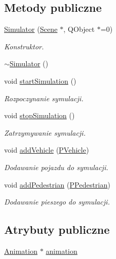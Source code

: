 \subsection*{Metody publiczne}
\begin{DoxyCompactItemize}
\item 
\hyperlink{class_simulator_a777790f7422ca543634ed4ac80862f6a}{Simulator} (\hyperlink{class_scene}{Scene} $\ast$, Q\-Object $\ast$=0)
\begin{DoxyCompactList}\small\item\em Konstruktor. \end{DoxyCompactList}\item 
\hyperlink{class_simulator_a0f49aa04f42060a785adf77346b9de9f}{$\sim$\-Simulator} ()
\item 
void \hyperlink{class_simulator_a7c1fedfeee2955be5805acb2f9ad74a4}{start\-Simulation} ()
\begin{DoxyCompactList}\small\item\em Rozpoczynanie symulacji. \end{DoxyCompactList}\item 
void \hyperlink{class_simulator_a2a296c0672d3093a491fd0c399fa1e44}{stop\-Simulation} ()
\begin{DoxyCompactList}\small\item\em Zatrzymywanie symulacji. \end{DoxyCompactList}\item 
void \hyperlink{class_simulator_ac3c8dfab9bf1ccbc61bad82e369851bc}{add\-Vehicle} (\hyperlink{_types_8h_a564207d327881e8bcfa0843e1a874756}{P\-Vehicle})
\begin{DoxyCompactList}\small\item\em Dodawanie pojazdu do symulacji. \end{DoxyCompactList}\item 
void \hyperlink{class_simulator_a63e6b1e0b6cde8d6430fa4a4c1c35308}{add\-Pedestrian} (\hyperlink{_types_8h_a6ca5cb67bb3df872d4650820dbc647b8}{P\-Pedestrian})
\begin{DoxyCompactList}\small\item\em Dodawanie pieszego do symulacji. \end{DoxyCompactList}\end{DoxyCompactItemize}
\subsection*{Atrybuty publiczne}
\begin{DoxyCompactItemize}
\item 
\hyperlink{class_animation}{Animation} $\ast$ \hyperlink{class_simulator_afa279a763fb0f744606c7d343ee9843d}{animation}
\end{DoxyCompactItemize}
